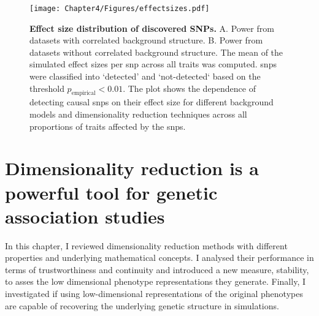 %
\begin{figure}[hbtp]
	\centering
	\texttt{[image: Chapter4/Figures/effectsizes.pdf]}
	\caption[\textbf{Effect size distribution of discovered SNPs.}]{\textbf{Effect size distribution of discovered SNPs. } A. Power from datasets with correlated background structure. B. Power from datasets without correlated background structure. The mean of the simulated effect sizes per \gls{snp} across all traits was computed. \glspl{snp} were classified into `detected' and `not-detected` based on the threshold \(p_\text{empirical} < 0.01\). The plot shows the dependence of detecting causal \glspl{snp} on their effect size for different background models and dimensionality reduction techniques across all proportions of traits affected by the \glspl{snp}.} 
	 	\label{fig:effectsizes-dimRed}
\end{figure}
%
\section{Dimensionality reduction is a powerful tool for genetic association studies}
In this chapter, I reviewed dimensionality reduction methods with different properties and underlying mathematical concepts. I analysed their performance in terms of trustworthiness and continuity and introduced a new measure, stability, to asses the low dimensional phenotype representations they generate. Finally, I investigated if using low-dimensional representations of the original phenotypes are capable of recovering the underlying genetic structure in simulations.

